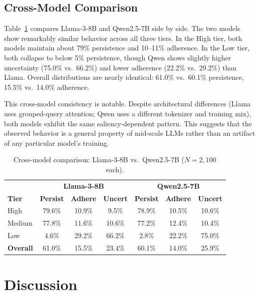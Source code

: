 \documentclass[11pt, letterpaper]{article}
\begin{document}
\subsection*{Cross-Model Comparison}

Table~\ref{tab:crossmodel} compares Llama-3-8B and Qwen2.5-7B side by side. The two models show remarkably similar behavior across all three tiers. In the High tier, both models maintain about 79\% persistence and 10--11\% adherence. In the Low tier, both collapse to below 5\% persistence, though Qwen shows slightly higher uncertainty (75.0\% vs.\ 66.2\%) and lower adherence (22.2\% vs.\ 29.2\%) than Llama. Overall distributions are nearly identical: 61.0\% vs.\ 60.1\% persistence, 15.5\% vs.\ 14.0\% adherence.

This cross-model consistency is notable. Despite architectural differences (Llama uses grouped-query attention; Qwen uses a different tokenizer and training mix), both models exhibit the same saliency-dependent pattern. This suggests that the observed behavior is a general property of mid-scale LLMs rather than an artifact of any particular model's training.

\begin{table}[H]
\centering
\caption{Cross-model comparison: Llama-3-8B vs.\ Qwen2.5-7B ($N=2{,}100$ each).}
\label{tab:crossmodel}
\begin{tabular}{l|ccc|ccc}
\toprule
 & \multicolumn{3}{c|}{\textbf{Llama-3-8B}} & \multicolumn{3}{c}{\textbf{Qwen2.5-7B}} \\
\textbf{Tier} & \textbf{Persist} & \textbf{Adhere} & \textbf{Uncert} & \textbf{Persist} & \textbf{Adhere} & \textbf{Uncert} \\
\midrule
High   & 79.6\% & 10.9\% & 9.5\%  & 78.9\% & 10.5\% & 10.6\% \\
Medium & 77.8\% & 11.6\% & 10.6\% & 77.2\% & 12.4\% & 10.4\% \\
Low    & 4.6\%  & 29.2\% & 66.2\% & 2.8\%  & 22.2\% & 75.0\% \\
\midrule
\textbf{Overall} & 61.0\% & 15.5\% & 23.4\% & 60.1\% & 14.0\% & 25.9\% \\
\bottomrule
\end{tabular}
\end{table}

\section*{Discussion}
\end{document}
